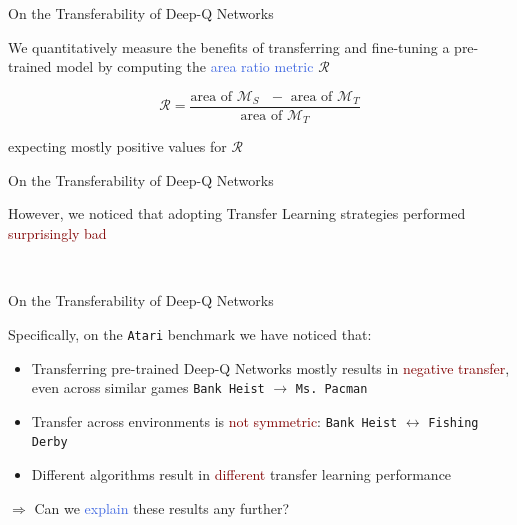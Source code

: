 \documentclass{beamer}
\begin{document}
\begin{frame}{On the Transferability of Deep-Q Networks}

	We quantitatively measure the benefits of transferring and fine-tuning a pre-trained model by computing the \textcolor{RoyalBlue}{area ratio metric} $\mathscr{R}$

	\begin{equation*}
		\mathscr{R} = \frac{\text{area of $\mathcal{M}_S$ $-$ area of $\mathcal{M}_T$}}{\text{area of $\mathcal{M}_T$}}
	\label{eq:area_ratio_metric}
	\end{equation*}

	\bigskip
	expecting mostly positive values for $\mathscr{R}$

\end{frame}

\begin{frame}{On the Transferability of Deep-Q Networks}

	\bigskip

	However, we noticed that adopting Transfer Learning strategies performed \textcolor{Maroon}{surprisingly bad}

	\begin{table}[t!]
	{}
	\label{tab:dqv_res}


        ~\\
	{}
	\label{tab:ddqn_res}
\end{table}

\end{frame}


\begin{frame}{On the Transferability of Deep-Q Networks}

	Specifically, on the \texttt{Atari} benchmark we have noticed that:
	\bigskip
	\begin{itemize}
		\item Transferring pre-trained Deep-Q Networks mostly results in \textcolor{Maroon}{negative transfer}, even across similar games \texttt{Bank Heist} $\rightarrow$ \texttt{Ms. Pacman}
		\item Transfer across environments is \textcolor{Maroon}{not symmetric}: \texttt{Bank Heist} $\leftrightarrow$ \texttt{Fishing Derby}
		\item Different algorithms result in \textcolor{Maroon}{different} transfer learning performance
	\end{itemize}

	\bigskip

	$\Rightarrow$ Can we \textcolor{RoyalBlue}{explain} these results any further?

\end{frame}
\end{document}
